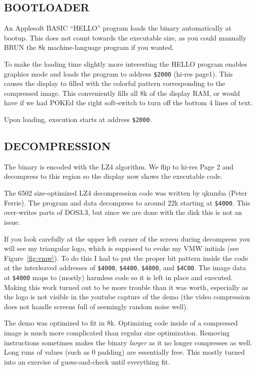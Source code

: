 \documentclass[twocolumn]{article}
\begin{document}
\subsection{BOOTLOADER}

An Applesoft BASIC ``HELLO'' program loads the binary automatically at bootup.
This does not count towards the executable size, as you could manually BRUN 
the 8k machine-language program if you wanted.

To make the loading time slightly more interesting the HELLO program enables
graphics mode and loads the program to address {\tt \$2000} (hi-res page1).
This causes the display to filled with the colorful pattern corresponding
to the compressed image.
This conveniently fills all 8k of the display RAM, or would have
if we had POKEd the right soft-switch to turn off
the bottom 4 lines of text.

Upon loading, execution starts at address {\tt \$2000}.

\subsection{DECOMPRESSION}

The binary is encoded with the LZ4 algorithm.
We flip to hi-res Page 2 and decompress to this region so the display
now shows the executable code.

The 6502 size-optimized LZ4 decompression code was written by qkumba
(Peter Ferrie).
The program and data decompress to around 22k starting at {\tt \$4000}.
This over-writes parts of DOS3.3, but since we are done with the disk
this is not an issue.

If you look carefully at the upper left corner of the screen during
decompress you will see my triangular logo, which is supposed to evoke
my VMW initials (see Figure~\ref{fig:vmw}).
To do this I had to put the proper bit pattern inside the code
at the interleaved addresses of {\tt \$4000}, {\tt \$4400}, {\tt \$4800},
and {\tt \$4C00}.
The image data at {\tt \$4000} maps to (mostly)
harmless code so it is left in place and executed.
Making this work turned out to be more trouble than it was worth, especially
as the logo is not visible in the youtube capture of the demo (the video
compression does not handle screens full of seemingly random noise well).

The demo was optimized to fit in 8k.
Optimizing code inside of a compressed image is much more complicated than
regular size optimization.
Removing instructions sometimes makes the binary {\em larger} as it no longer
compresses as well.
Long runs of values (such as 0 padding) are essentially free.
This mostly turned into an exercise of guess-and-check until everything fit.
\end{document}
